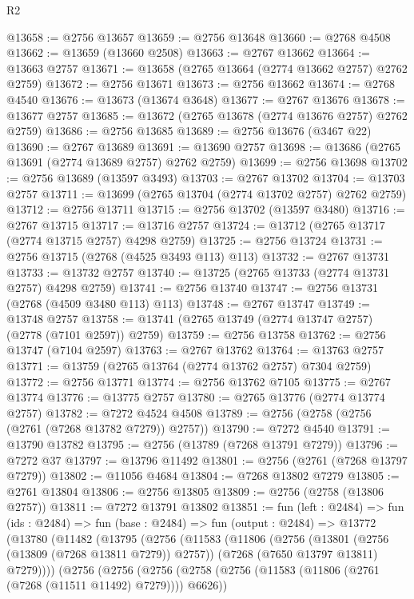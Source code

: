 \begin{lexlean}{R2}
\begin{coremodule}
@13658 := @2756 @13657
@13659 := @2756 @13648
@13660 := @2768 @4508
@13662 := @13659 (@13660 @2508)
@13663 := @2767 @13662
@13664 := @13663 @2757
@13671 := @13658 (@2765 @13664 (@2774 @13662 @2757) @2762 @2759)
@13672 := @2756 @13671
@13673 := @2756 @13662
@13674 := @2768 @4540
@13676 := @13673 (@13674 @3648)
@13677 := @2767 @13676
@13678 := @13677 @2757
@13685 := @13672 (@2765 @13678 (@2774 @13676 @2757) @2762 @2759)
@13686 := @2756 @13685
@13689 := @2756 @13676 (@3467 @22)
@13690 := @2767 @13689
@13691 := @13690 @2757
@13698 := @13686 (@2765 @13691 (@2774 @13689 @2757) @2762 @2759)
@13699 := @2756 @13698
@13702 := @2756 @13689 (@13597 @3493)
@13703 := @2767 @13702
@13704 := @13703 @2757
@13711 := @13699 (@2765 @13704 (@2774 @13702 @2757) @2762 @2759)
@13712 := @2756 @13711
@13715 := @2756 @13702 (@13597 @3480)
@13716 := @2767 @13715
@13717 := @13716 @2757
@13724 := @13712 (@2765 @13717 (@2774 @13715 @2757) @4298 @2759)
@13725 := @2756 @13724
@13731 := @2756 @13715 (@2768 (@4525 @3493 @113) @113)
@13732 := @2767 @13731
@13733 := @13732 @2757
@13740 := @13725 (@2765 @13733 (@2774 @13731 @2757) @4298 @2759)
@13741 := @2756 @13740
@13747 := @2756 @13731 (@2768 (@4509 @3480 @113) @113)
@13748 := @2767 @13747
@13749 := @13748 @2757
@13758 := @13741 (@2765 @13749 (@2774 @13747 @2757) (@2778 (@7101 @2597)) @2759)
@13759 := @2756 @13758
@13762 := @2756 @13747 (@7104 @2597)
@13763 := @2767 @13762
@13764 := @13763 @2757
@13771 := @13759 (@2765 @13764 (@2774 @13762 @2757) @7304 @2759)
@13772 := @2756 @13771
@13774 := @2756 @13762 @7105
@13775 := @2767 @13774
@13776 := @13775 @2757
@13780 := @2765 @13776 (@2774 @13774 @2757)
@13782 := @7272 @4524 @4508
@13789 := @2756 (@2758 (@2756 (@2761 (@7268 @13782 @7279)) @2757))
@13790 := @7272 @4540
@13791 := @13790 @13782
@13795 := @2756 (@13789 (@7268 @13791 @7279))
@13796 := @7272 @37
@13797 := @13796 @11492
@13801 := @2756 (@2761 (@7268 @13797 @7279))
@13802 := @11056 @4684
@13804 := @7268 @13802 @7279
@13805 := @2761 @13804
@13806 := @2756 @13805
@13809 := @2756 (@2758 (@13806 @2757))
@13811 := @7272 @13791 @13802
@13851 := fun (left : @2484) =>
  fun (ids : @2484) =>
  fun (base : @2484) =>
  fun (output : @2484) =>
  @13772
    (@13780
      (@11482
        (@13795
          (@2756
            (@11583
              (@11806
                (@2756
                  (@13801 (@2756 (@13809 (@7268 @13811 @7279)) @2757))
                  (@7268 (@7650 @13797 @13811) @7279))))
            (@2756
              (@2756
                (@2756
                  (@2758 (@2756 (@11583 (@11806 (@2761 (@7268 (@11511 @11492) @7279)))) @6626))

\end{coremodule}
\end{lexlean}
